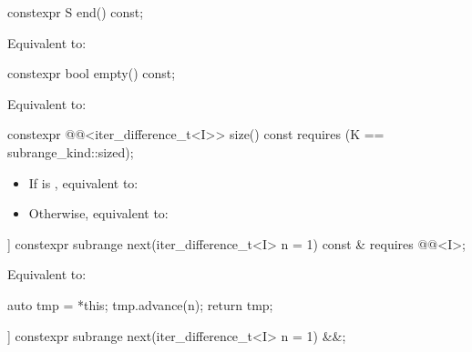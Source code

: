 %
\begin{itemdecl}
constexpr S end() const;
\end{itemdecl}

\begin{itemdescr}
\pnum
\effects
Equivalent to: 
\end{itemdescr}

%
\begin{itemdecl}
constexpr bool empty() const;
\end{itemdecl}

\begin{itemdescr}
\pnum
\effects
Equivalent to: 
\end{itemdescr}

%
\begin{itemdecl}
constexpr @@<iter_difference_t<I>> size() const
  requires (K == subrange_kind::sized);
\end{itemdecl}

\begin{itemdescr}
\pnum
\effects
\begin{itemize}
\item If  is , equivalent to: 
\item Otherwise, equivalent to: 
\end{itemize}
\end{itemdescr}

%
\begin{itemdecl}
[[nodiscard]] constexpr subrange next(iter_difference_t<I> n = 1) const &
  requires @@<I>;
\end{itemdecl}

\begin{itemdescr}
\pnum
\effects
Equivalent to:
\begin{codeblock}
auto tmp = *this;
tmp.advance(n);
return tmp;
\end{codeblock}
\end{itemdescr}

%
\begin{itemdecl}
[[nodiscard]] constexpr subrange next(iter_difference_t<I> n = 1) &&;
\end{itemdecl}

